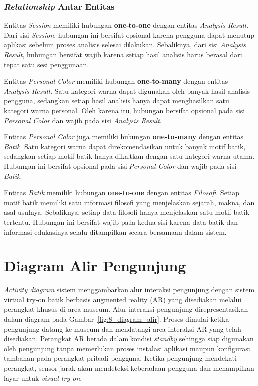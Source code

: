     \subsubsection{\textit{Relationship} Antar Entitas}
    \label{subsubsec:relationship}
    
        Entitas \textit{Session} memiliki hubungan \textbf{one-to-one} dengan entitas \textit{Analysis Result}. Dari sisi \textit{Session}, hubungan ini bersifat opsional karena pengguna dapat menutup aplikasi sebelum proses analisis selesai dilakukan. Sebaliknya, dari sisi \textit{Analysis Result}, hubungan bersifat wajib karena setiap hasil analisis harus berasal dari tepat satu sesi penggunaan.
        
        Entitas \textit{Personal Color} memiliki hubungan \textbf{one-to-many} dengan entitas \textit{Analysis Result}. Satu kategori warna dapat digunakan oleh banyak hasil analisis pengguna, sedangkan setiap hasil analisis hanya dapat menghasilkan satu kategori warna personal. Oleh karena itu, hubungan bersifat opsional pada sisi \textit{Personal Color} dan wajib pada sisi \textit{Analysis Result}.
        
        Entitas \textit{Personal Color} juga memiliki hubungan \textbf{one-to-many} dengan entitas \textit{Batik}. Satu kategori warna dapat direkomendasikan untuk banyak motif batik, sedangkan setiap motif batik hanya dikaitkan dengan satu kategori warna utama. Hubungan ini bersifat opsional pada sisi \textit{Personal Color} dan wajib pada sisi \textit{Batik}.
        
        Entitas \textit{Batik} memiliki hubungan \textbf{one-to-one} dengan entitas \textit{Filosofi}. Setiap motif batik memiliki satu informasi filosofi yang menjelaskan sejarah, makna, dan asal-usulnya. Sebaliknya, setiap data filosofi hanya menjelaskan satu motif batik tertentu. Hubungan ini bersifat wajib pada kedua sisi karena data batik dan informasi edukasinya selalu ditampilkan secara bersamaan dalam sistem.

\section{Diagram Alir Pengunjung}
\label{sec:DiagramAlirPengunjung}

\textit{Activity diagram} sistem menggambarkan alur interaksi pengunjung dengan sistem virtual try-on batik berbasis augmented reality (AR) yang disediakan melalui perangkat khusus di area museum. Alur interaksi pengunjung direpresentasikan dalam diagram pada Gambar~\ref{fig:8_diagram_alir}. Proses dimulai ketika pengunjung datang ke museum dan mendatangi area interaksi AR yang telah disediakan. Perangkat AR berada dalam kondisi \textit{standby} sehingga siap digunakan oleh pengunjung tanpa memerlukan proses instalasi aplikasi maupun konfigurasi tambahan pada perangkat pribadi pengguna. Ketika pengunjung mendekati perangkat, sensor jarak akan mendeteksi keberadaan pengguna dan menampilkan layar untuk \textit{visual try-on}.

